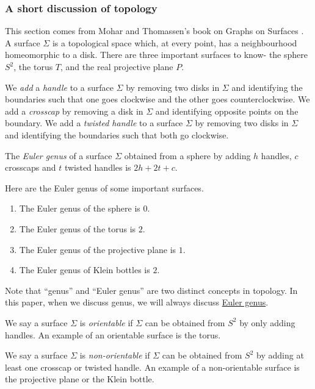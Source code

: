 \subsubsection{A short discussion of topology}\label{sssec:topology}
This section comes from Mohar and Thomassen's book on Graphs on Surfaces \cite{moharGraphsSurfaces2001}. A surface \(\Sigma\) is a topological space which, at every point, has a neighbourhood homeomorphic to a disk. There are three important surfaces to know- the sphere \(S^2\), the torus \(T\), and the real projective plane \(P\).
\par
We \textit{add} a \textit{handle} to a surface \(\Sigma\) by removing two disks in \(\Sigma\) and identifying the boundaries such that one goes clockwise and the other goes counterclockwise. We add a \textit{crosscap} by removing a disk in \(\Sigma\) and identifying opposite points on the boundary. We add a \textit{twisted handle} to a surface \(\Sigma\) by removing two disks in \(\Sigma\) and identifying the boundaries such that both go clockwise.
\par
\begin{definition}
	The \textit{Euler genus} of a surface \(\Sigma\) obtained from a sphere by adding \(h\) handles, \(c\) crosscaps and \(t\) twisted handles is \(2h + 2t + c\).
\end{definition}

\begin{example}
	Here are the Euler genus of some important surfaces.
	\begin{enumerate}
		\item The Euler genus of the sphere is \(0\).
		\item The Euler genus of the torus is \(2\).
		\item The Euler genus of the projective plane is \(1\). 
		\item The Euler genus of Klein bottles is \(2\). 
	\end{enumerate}
\end{example}

Note that ``genus'' and ``Euler genus'' are two distinct concepts in topology. In this paper, when we discuss genus, we will always discuss \underline{Euler genus}.

We say a surface \(\Sigma\) is \textit{orientable} if \(\Sigma\) can be obtained from \(S^2\) by only adding handles. An example of an orientable surface is the torus.

We say a surface \(\Sigma\) is \textit{non-orientable} if \(\Sigma\) can be obtained from \(S^2\) by adding at least one crosscap or twisted handle. An example of a non-orientable surface is the projective plane or the Klein bottle. 

